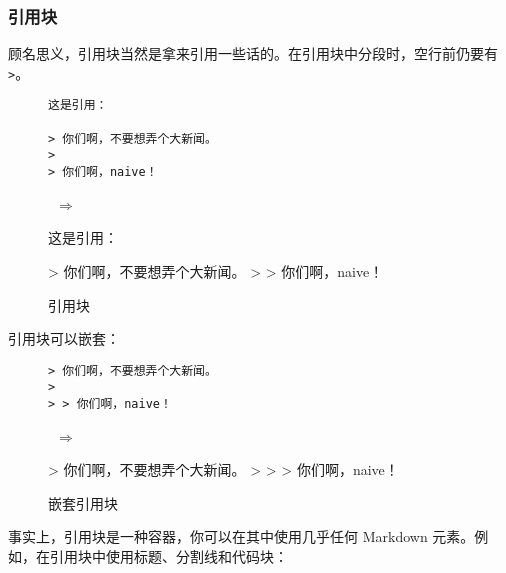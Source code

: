 \documentclass[a4paper,fontset=none]{ctexart}
\begin{document}
\subsubsection{引用块}

顾名思义，引用块当然是拿来引用一些话的。在引用块中分段时，空行前仍要有 \verb|>|。

\begin{figure}[H]
    \centering
    \begin{minipage}{0.45\textwidth}
        \begin{verbatim}
这是引用：

> 你们啊，不要想弄个大新闻。
>
> 你们啊，naive！
        \end{verbatim}
    \end{minipage}
    \, $\Longrightarrow$ \,
    \begin{minipage}{0.45\textwidth}
\begin{markdown}
这是引用：

> 你们啊，不要想弄个大新闻。
>
> 你们啊，naive！
\end{markdown}
    \end{minipage}
    \caption{引用块}
\end{figure}

引用块可以嵌套：

\begin{figure}[H]
    \centering
    \begin{minipage}{0.45\textwidth}
        \begin{verbatim}
> 你们啊，不要想弄个大新闻。
>
> > 你们啊，naive！
        \end{verbatim}
    \end{minipage}
    \, $\Longrightarrow$ \,
    \begin{minipage}{0.45\textwidth}
\begin{markdown}
> 你们啊，不要想弄个大新闻。
>
> > 你们啊，naive！
\end{markdown}
    \end{minipage}
    \caption{嵌套引用块}
\end{figure}

事实上，引用块是一种容器，你可以在其中使用几乎任何 Markdown 元素。例如，在引用块中使用标题、分割线和代码块：
\end{document}
